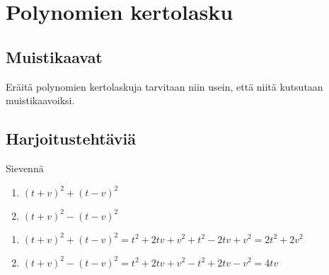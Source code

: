 \chapter{Polynomien kertolasku}

\section{Muistikaavat}

Eräitä polynomien kertolaskuja tarvitaan niin usein, että niitä kutsutaan muistikaavoiksi.



\section{Harjoitustehtäviä}

\begin{tehtava}
    Sievennä
    \begin{enumerate}
        \item $(t+v)^2+(t-v)^2$
        \item $(t+v)^2-(t-v)^2$
    \end{enumerate}
    \begin{vastaus}
        \begin{enumerate}
            \item $(t+v)^2+(t-v)^2 = t^2+2tv+v^2+t^2-2tv+v^2 = 2t^2+2v^2$
            \item $(t+v)^2-(t-v)^2 = t^2+2tv+v^2-t^2+2tv-v^2 = 4tv$
        \end{enumerate}
    \end{vastaus}
\end{tehtava}


